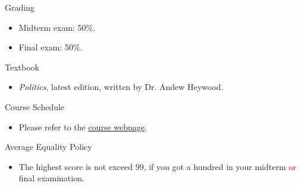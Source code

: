 \documentclass{article}
\begin{document}
\newpage
\begin{flushleft}
Grading \\
\end{flushleft}
\begin{itemize}
\item Midterm exam: 50\%. \\
\item Final exam: 50\%. \\
\end{itemize}
Textbook \\
\begin{itemize}
\item \textit{Politics}, latest edition, written by Dr. Andew Heywood. \\
\end{itemize}
Course Schedule \\
\begin{itemize}
\item Please refer to the \href{https://politics-tchsiao.github.io/politics/}{course webpage}. \\
\end{itemize}
Average Equality Policy \\
\begin{itemize}
\item The highest score is not exceed 99, if you got a hundred in your midterm \textcolor{red}{or} final examination. \\
\end{itemize}
\end{document}
